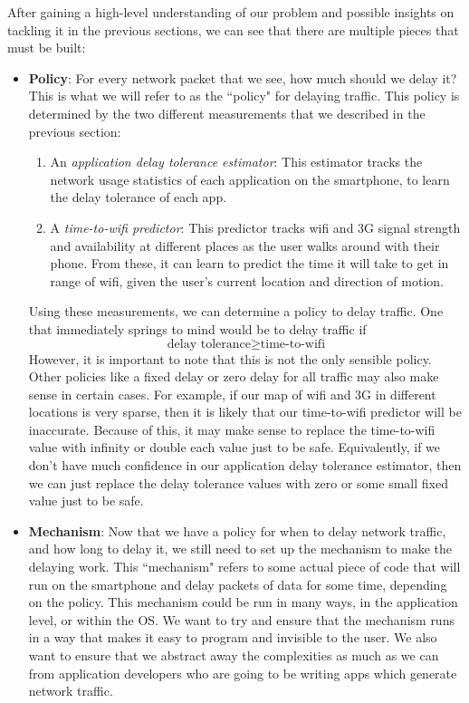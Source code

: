 \documentclass[12pt, fleqn]{article}
\begin{document}
After gaining a high-level understanding of our problem and possible insights on 
tackling it in the previous sections, we can see that there are multiple pieces that 
must be built:

\begin{itemize}
  \item \textbf{Policy}: For every network packet that we see, how much should 
  we delay it? This is what we will refer to as the ``policy" for delaying 
  traffic. This policy is determined by the two different measurements that 
  we described in the previous section:
  \begin{enumerate}
     \item An \emph{application delay tolerance estimator}: This estimator 
     tracks the network usage statistics of each application on the smartphone, 
     to learn the delay tolerance of each app. 
     
    \item A \emph{time-to-wifi predictor}: This predictor tracks wifi and 3G 
    signal strength and availability at different places as the user walks around 
    with their phone. From these, it can learn to predict the time it will take 
    to get in range of wifi, given the user's current location and direction of 
    motion.
  \end{enumerate}
  
  Using these measurements, we can determine a policy to delay traffic. One that immediately
  springs to mind would be to delay traffic if 
  \[\textrm{delay tolerance} \geq \textrm{time-to-wifi} \]
  However, it is important to note that this is not the only sensible policy. 
  Other policies like a fixed delay or zero delay for all traffic may also make sense in certain 
  cases. For example, if our map of wifi and 3G in different locations is very sparse, 
  then it is likely that our time-to-wifi predictor will be inaccurate. Because 
  of this, it may make sense to replace the time-to-wifi value with infinity or double 
  each value just to be safe. Equivalently, if we don't have much confidence in 
  our application delay tolerance estimator, then we can just replace the delay 
  tolerance values with zero or some small fixed value just to be safe. 
  
  \item \textbf{Mechanism}: Now that we have a policy for when to delay network 
  traffic, and how long to delay it, we still need to set up the mechanism to make the delaying 
  work. This ``mechanism" refers to some actual piece of code that will run on 
  the smartphone and delay packets of data for some time, depending on the 
  policy. This mechanism could be run in many ways, in the application level, or 
  within the OS. We want to try and ensure that the mechanism runs in a way that 
  makes it easy to program and invisible to the user. We also want to ensure that we
  abstract away the complexities as much as we can from application developers 
  who are going to be writing apps which generate network traffic.
\end{itemize}
\end{document}
